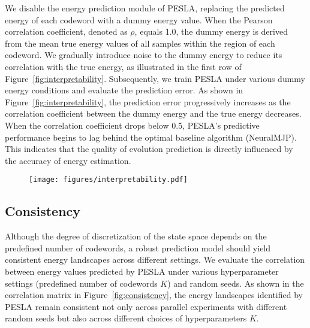 We disable the energy prediction module of PESLA, replacing the predicted energy of each codeword with a dummy energy value. When the Pearson correlation coefficient, denoted as $\rho$, equals 1.0, the dummy energy is derived from the mean true energy values of all samples within the region of each codeword. We gradually introduce noise to the dummy energy to reduce its correlation with the true energy, as illustrated in the first row of Figure~\ref{fig:interpretability}. Subsequently, we train PESLA under various dummy energy conditions and evaluate the prediction error. As shown in Figure~\ref{fig:interpretability}, the prediction error progressively increases as the correlation coefficient between the dummy energy and the true energy decreases. When the correlation coefficient drops below 0.5, PESLA’s predictive performance begins to lag behind the optimal baseline algorithm (NeuralMJP). This indicates that the quality of evolution prediction is directly influenced by the accuracy of energy estimation.

\begin{sidewaysfigure}
    \centering
    \begin{subfigure}[b]{\textwidth} %
        \centering
        \texttt{[image: figures/interpretability.pdf]}
    \end{subfigure}

    \caption{Evolution prediction accuracy as a function of the correlation coefficient $\rho$ between the dummy energy and the true energy on the 2D Prinz potential. The skyblue and red dashed lines are the optimal baseline and PESLA performances in the main text, respectively. All experiments are run 10 times to obtain statistical values.}
    \label{fig:interpretability}
\end{sidewaysfigure}


\subsection{Consistency}

Although the degree of discretization of the state space depends on the predefined number of codewords, a robust prediction model should yield consistent energy landscapes across different settings. We evaluate the correlation between energy values predicted by PESLA under various hyperparameter settings (predefined number of codewords $K$) and random seeds. As shown in the correlation matrix in Figure~\ref{fig:consistency}, the energy landscapes identified by PESLA remain consistent not only across parallel experiments with different random seeds but also across different choices of hyperparameters $K$.


